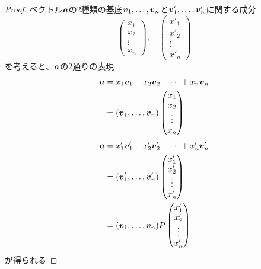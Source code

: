 \documentclass[../../../topic_linear-algebra]{subfiles}
\begin{document}
\begin{proof}
  ベクトル$\vb*{a}$の2種類の基底$\vb*{v}_1, \ldots, \vb*{v}_n$と$\vb*{v}'_1, \ldots, \vb*{v}'_n$に関する成分
  \begin{equation*}
    \begin{pmatrix}
      x_1    \\
      x_2    \\
      \vdots \\
      x_n
    \end{pmatrix},\quad
    \begin{pmatrix}
      x'_1   \\
      x'_2   \\
      \vdots \\
      x'_n
    \end{pmatrix}
  \end{equation*}
  を考えると、$\vb*{a}$の2通りの表現
  \begin{align*}
    \vb*{a} & = x_1 \vb*{v}_1 + x_2 \vb*{v}_2 + \cdots + x_n \vb*{v}_n \\
            & = (\vb*{v}_1, \ldots, \vb*{v}_n) \begin{pmatrix}
                                                 x_1    \\
                                                 x_2    \\
                                                 \vdots \\
                                                 x_n
                                               \end{pmatrix}
  \end{align*}
  \begin{align*}
    \vb*{a} & = x'_1 \vb*{v}'_1 + x'_2 \vb*{v}'_2 + \cdots + x'_n \vb*{v}'_n \\
            & = (\vb*{v}'_1, \ldots, \vb*{v}'_n) \begin{pmatrix}
                                                   x'_1   \\
                                                   x'_2   \\
                                                   \vdots \\
                                                   x'_n
                                                 \end{pmatrix}              \\
            & = (\vb*{v}_1, \ldots, \vb*{v}_n) P \begin{pmatrix}
                                                   x'_1   \\
                                                   x'_2   \\
                                                   \vdots \\
                                                   x'_n
                                                 \end{pmatrix}
  \end{align*}
  が得られる


\end{proof}
\end{document}
